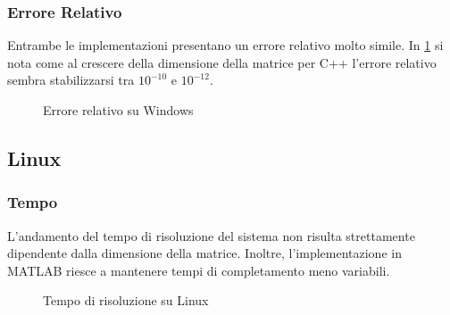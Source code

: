 \documentclass[11pt,italian]{article}
\begin{document}
\smallskip
\subsubsection*{Errore Relativo}
Entrambe le implementazioni presentano un errore relativo molto simile.
In \cref{fig:windows-error} si nota come al crescere della dimensione della matrice per C++ l'errore relativo sembra stabilizzarsi tra $10^{-10}$ e $10^{-12}$.
\begin{figure}[H]
    \caption{Errore relativo su Windows}
    \label{fig:windows-error}
\end{figure}

\subsection{Linux}
\subsubsection*{Tempo}
L'andamento del tempo di risoluzione del sistema non risulta strettamente dipendente dalla dimensione della matrice. Inoltre, l'implementazione in MATLAB riesce a mantenere tempi di completamento meno variabili.
\begin{figure}[H]
    \caption{Tempo di risoluzione su Linux}
    \label{fig:linux-time}
\end{figure}
\end{document}

